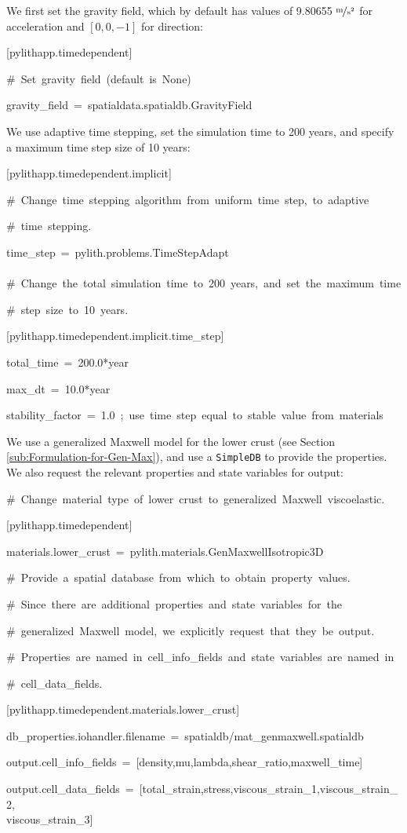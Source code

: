 We first set the gravity field, which by default has values of 9.80655
$\unitfrac{m}{s^{2}}$ for acceleration and $\left[0,0,-1\right]$
for direction:
\begin{lyxcode}
{[}pylithapp.timedependent{]}

\#~Set~gravity~field~(default~is~None)

gravity\_field~=~spatialdata.spatialdb.GravityField
\end{lyxcode}
We use adaptive time stepping, set the simulation time to 200 years,
and specify a maximum time step size of 10 years:
\begin{lyxcode}
{[}pylithapp.timedependent.implicit{]}

\#~Change~time~stepping~algorithm~from~uniform~time~step,~to~adaptive

\#~time~stepping.

time\_step~=~pylith.problems.TimeStepAdapt~\\
~\\


\#~Change~the~total~simulation~time~to~200~years,~and~set~the~maximum~time

\#~step~size~to~10~years.

{[}pylithapp.timedependent.implicit.time\_step{]}

total\_time~=~200.0{*}year

max\_dt~=~10.0{*}year

stability\_factor~=~1.0~;~use~time~step~equal~to~stable~value~from~materials
\end{lyxcode}
We use a generalized Maxwell model for the lower crust (see Section
\ref{sub:Formulation-for-Gen-Max}), and use a \texttt{SimpleDB} to
provide the properties. We also request the relevant properties and
state variables for output:
\begin{lyxcode}
\#~Change~material~type~of~lower~crust~to~generalized~Maxwell~viscoelastic.

{[}pylithapp.timedependent{]}

materials.lower\_crust~=~pylith.materials.GenMaxwellIsotropic3D

\#~Provide~a~spatial~database~from~which~to~obtain~property~values.

\#~Since~there~are~additional~properties~and~state~variables~for~the

\#~generalized~Maxwell~model,~we~explicitly~request~that~they~be~output.

\#~Properties~are~named~in~cell\_info\_fields~and~state~variables~are~named~in

\#~cell\_data\_fields.

{[}pylithapp.timedependent.materials.lower\_crust{]}

db\_properties.iohandler.filename~=~spatialdb/mat\_genmaxwell.spatialdb

output.cell\_info\_fields~=~{[}density,mu,lambda,shear\_ratio,maxwell\_time{]}

output.cell\_data\_fields~=~{[}total\_strain,stress,viscous\_strain\_1,viscous\_strain\_2,~\\
viscous\_strain\_3{]}
\end{lyxcode}
